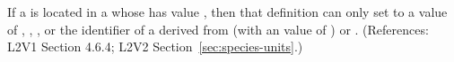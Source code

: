 If a \Species is located in a \Compartment whose 
has value , then that \Species definition can only set
 to a value of , ,
, or the identifier of a \UnitDefinition derived from
 (with an  value of ) or
.  (References: L2V1 Section 4.6.4; L2V2
Section~\ref{sec:species-units}.)
